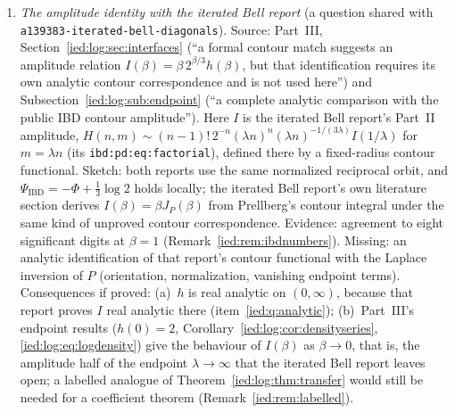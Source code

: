 \documentclass[11pt,letterpaper]{article}
\theoremstyle{remark}\newtheorem{remark}[theorem]{Remark}
\newcommand{\file}[1]{\nolinkurl{#1}}
\begin{document}
\begin{enumerate}[label=\arabic*.,ref=\arabic*,leftmargin=*,itemsep=4pt]
\item\label{ied:q:ibd} \emph{The amplitude identity with the iterated Bell report} (a question shared with \file{a139383-iterated-bell-diagonals}). Source: Part~III, Section~\ref{ied:log:sec:interfaces} (``a formal contour match suggests an amplitude relation $I(\beta)=\beta\,2^{\beta/3}h(\beta)$, but that identification requires its own analytic contour correspondence and is not used here'') and Subsection~\ref{ied:log:sub:endpoint} (``a complete analytic comparison with the public IBD contour amplitude''). Here $I$ is the iterated Bell report's Part~II amplitude, $H(n,m)\sim(n-1)!\,2^{-n}(\lambda n)^n(\lambda n)^{-1/(3\lambda)}I(1/\lambda)$ for $m=\lambda n$ (its \texttt{ibd:pd:eq:factorial}), defined there by a fixed-radius contour functional. Sketch: both reports use the same normalized reciprocal orbit, and $\Psi_{\mathrm{IBD}}=-\Phi+\frac13\log2$ holds locally; the iterated Bell report's own literature section derives $I(\beta)=\beta J_P(\beta)$ from Prellberg's contour integral under the same kind of unproved contour correspondence. Evidence: agreement to eight significant digits at $\beta=1$ (Remark~\ref{ied:rem:ibdnumbers}). Missing: an analytic identification of that report's contour functional with the Laplace inversion of $P$ (orientation, normalization, vanishing endpoint terms). Consequences if proved: (a)~$h$ is real analytic on $(0,\infty)$, because that report proves $I$ real analytic there (item~\ref{ied:q:analytic}); (b)~Part~III's endpoint results ($h(0)=2$, Corollary~\ref{ied:log:cor:densityseries}, \eqref{ied:log:eq:logdensity}) give the behaviour of $I(\beta)$ as $\beta\to0$, that is, the amplitude half of the endpoint $\lambda\to\infty$ that the iterated Bell report leaves open; a labelled analogue of Theorem~\ref{ied:log:thm:transfer} would still be needed for a coefficient theorem (Remark~\ref{ied:rem:labelled}).
\end{enumerate}
\end{document}
